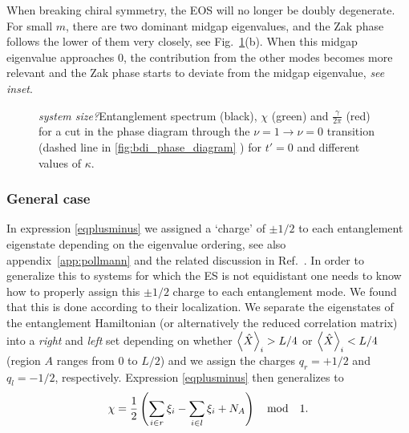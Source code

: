 \documentclass[twocolumn,amsmath,longbibliography,amssymb,superscriptaddress]{revtex4-1}
\newcommand{\mariac}[1]{{\it\color{cyan}#1}}
\begin{document}
When breaking chiral symmetry, the EOS will no longer be doubly degenerate. 
For small $m$, there are two dominant midgap eigenvalues, and the Zak phase follows the lower of them very closely, see Fig.~\ref{huang}(b).
When this midgap eigenvalue approaches  0, the contribution from the other modes becomes more relevant and the Zak phase starts to deviate from the midgap eigenvalue, \mariac{see inset}.
\begin{figure}[h!]
\centering
{}
\caption{\mariac{system size?}Entanglement spectrum (black), $\chi$ (green) and $\frac{\gamma}{2\pi}$ (red) for a cut in the phase diagram through the $\nu = 1 \rightarrow \nu = 0$ transition (dashed line in 	\ref{fig:bdi_phase_diagram}
	) for $t'=0$ and different values of $\kappa$.}
\label{huang}
\end{figure}

\subsubsection{General case}

In expression 	\eqref{eqplusminus} we assigned a `charge'  of $\pm1/2$ to each entanglement eigenstate depending on the eigenvalue ordering, see also appendix~\ref{app:pollmann} and the related discussion in Ref.~\cite{Zaletel2014}. 
In order to generalize this to systems for which the ES is not equidistant  one needs to know how to properly assign this $\pm 1/2$ charge to each entanglement mode. We found that this is done according to their localization. 
We separate the eigenstates of the entanglement Hamiltonian (or alternatively the reduced correlation matrix) into a \emph{right} and \emph{left} set depending on whether $\expval{\hat{X}}_i > L/4$ or $\expval{\hat{X}}_i < L/4$ (region $A$ ranges from $0$ to $L/2$) and we assign the charges $q_r = +1/2$ and $q_l = -1/2$, respectively.
 Expression \ref{eqplusminus} then generalizes to
\begin{equation}
\chi = \frac{1}{2} \left( \sum_{i\in r}\xi_i-\sum_{i\in l}\xi_i+ N_A \right) \quad {\rm mod} \quad 1.
\label{eq_loc}
\end{equation}
\end{document}
